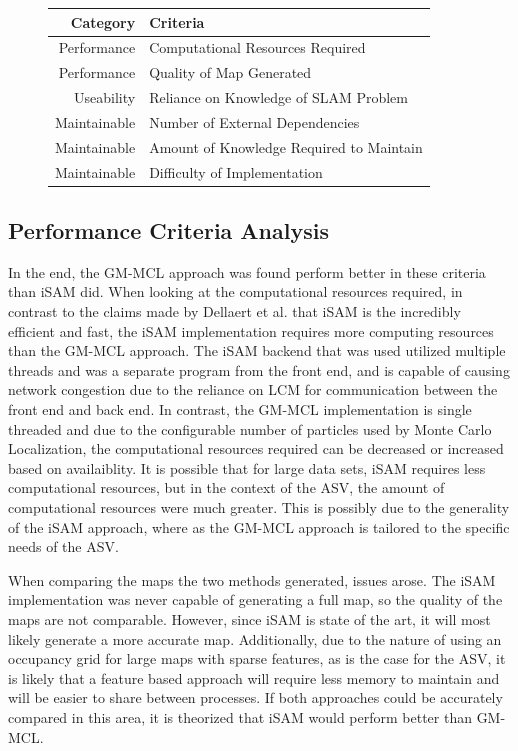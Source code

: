 \documentclass[10pt]{IEEEtran}
\begin{document}
\begin{figure}
\begin{tabular} { r | l }
\label{fig:AnalysisCriteria}
	Category & Criteria \\
	\hline Performance & Computational Resources Required \\
	Performance & Quality of Map Generated \\
	Useability & Reliance on Knowledge of SLAM Problem \\
	Maintainable & Number of External Dependencies \\
	Maintainable & Amount of Knowledge Required to Maintain \\
	Maintainable & Difficulty of Implementation
\end{tabular}
\end{figure}

\subsection{Performance Criteria Analysis}
In the end, the GM-MCL approach was found perform better in these criteria than iSAM did.
When looking at the computational resources required, in contrast to the claims made by 
Dellaert et al. \cite{iSAM_website} that iSAM is the incredibly efficient and fast, 
the iSAM implementation requires more computing resources than the GM-MCL approach.  The 
iSAM backend that was used utilized multiple threads and
 was a separate program from the front end, and is capable of causing network congestion
due to the reliance on LCM for communication between the front end and back end.
In contrast, the GM-MCL implementation is single threaded
and due to the configurable number of particles used by Monte Carlo Localization, the 
computational resources required can be decreased or increased based on availaiblity.  It
is possible that for large data sets, iSAM requires less computational resources, but in
the context of the ASV, the amount of computational resources were much greater.  This is
possibly due to the generality of the iSAM approach, where as the GM-MCL approach is tailored
to the specific needs of the ASV.

When comparing the maps the two methods generated, issues arose.  The iSAM implementation was
never capable of generating a full map, so the quality of the maps are not comparable.  
However, since iSAM is state of the art, it will most likely generate a more accurate map.
Additionally, due to the nature of using an occupancy grid for large
maps with sparse features, as is the case for the ASV, it is likely that a feature based
approach will require less memory to maintain and will be easier to share between processes. 
If both approaches could be accurately compared in this area, it is theorized that iSAM would
perform better than GM-MCL.
\end{document}
